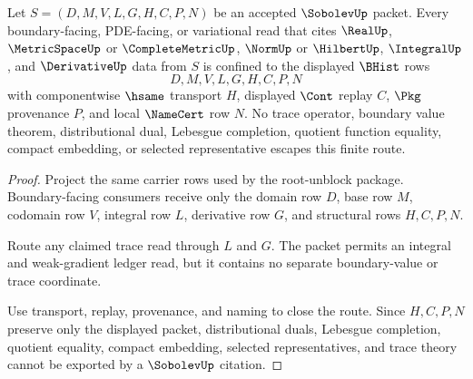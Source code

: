 \begin{theorem}
\label{thm:sobolev-root-trace-nonescape}
Let $S=(D,M,V,L,G,H,C,P,N)$ be an accepted $\SobolevUp$ packet. Every boundary-facing, PDE-facing, or variational read that cites $\RealUp$, $\MetricSpaceUp$ or $\CompleteMetricUp$, $\NormUp$ or $\HilbertUp$, $\IntegralUp$, and $\DerivativeUp$ data from $S$ is confined to the displayed $\BHist$ rows
$$
D,M,V,L,G,H,C,P,N
$$
with componentwise $\hsame$ transport $H$, displayed $\Cont$ replay $C$, $\Pkg$ provenance $P$, and local $\NameCert$ row $N$. No trace operator, boundary value theorem, distributional dual, Lebesgue completion, quotient function equality, compact embedding, or selected representative escapes this finite route.
\end{theorem}
\begin{proof}
Project the same carrier rows used by the root-unblock package. Boundary-facing consumers receive only the domain row $D$, base row $M$, codomain row $V$, integral row $L$, derivative row $G$, and structural rows $H,C,P,N$.

Route any claimed trace read through $L$ and $G$. The packet permits an integral and weak-gradient ledger read, but it contains no separate boundary-value or trace coordinate.

Use transport, replay, provenance, and naming to close the route. Since $H,C,P,N$ preserve only the displayed packet, distributional duals, Lebesgue completion, quotient equality, compact embedding, selected representatives, and trace theory cannot be exported by a $\SobolevUp$ citation.
\end{proof}

